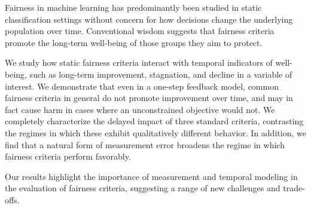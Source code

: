 Fairness in machine learning has predominantly been studied in static
classification settings without concern for how decisions change the underlying
population over time. Conventional wisdom suggests that fairness criteria
promote the long-term well-being of those groups they aim to protect.

We study how static fairness criteria interact with temporal indicators of
well-being, such as long-term improvement, stagnation, and decline in a variable
of interest. We demonstrate that even in a one-step feedback model, common
fairness criteria in general do not promote improvement over time, and may in
fact cause harm in cases where an unconstrained objective would not.
We completely characterize the delayed impact of three standard criteria,
contrasting the regimes in which these exhibit qualitatively different
behavior. In addition, we find that a natural form of measurement error broadens
the regime in which fairness criteria perform favorably.

Our results highlight the importance of measurement and temporal modeling in the
evaluation of fairness criteria, suggesting a range of new challenges and
trade-offs.